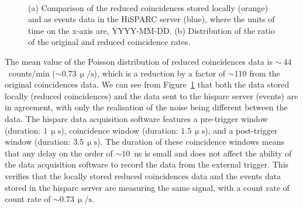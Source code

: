 \begin{figure}[ht!]
	\centering
	 \\
	
	\caption{(a) Comparison of the reduced coincidences stored locally (orange) and as events data in the HiSPARC server (blue), where the units of time on the x-axis are, YYYY-MM-DD. (b) Distribution of the ratio of the original and reduced coincidence rates.}
	\label{fig:reduced_coincidences}
\end{figure}

The mean value of the Poisson distribution of reduced coincidences data is $\sim~44$~counts/min ($\sim 0.73 \, \upmu/\mathrm{s}$), which is a reduction by a factor of $\sim 110$ from the original coincidences data. We can see from Figure~\ref{fig:reduced_coincidences} that both the data stored locally (reduced coincidences) and the data sent to the \gls{hisparc} server (events) are in agreement, with only the realisation of the noise being different between the data. The \gls{hisparc} data acquisition software features a pre-trigger window (duration: $1 \, \upmu\mathrm{s}$), coincidence window (duration: $1.5 \, \upmu\mathrm{s}$), and a post-trigger window (duration: $3.5 \, \upmu\mathrm{s}$). The duration of these coincidence windows means that any delay on the order of $\sim 10$~ns is small and does not affect the ability of the data acquisition software to record the data from the external trigger. This verifies that the locally stored reduced coincidences data and the events data stored in the \gls{hisparc} server are measuring the same signal, with a count rate of count rate of $\sim 0.73 \, \upmu/\mathrm{s}$.



